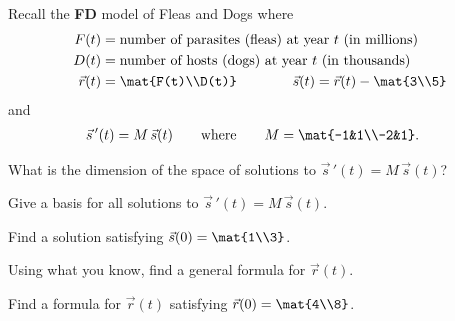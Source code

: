 \documentclass{workbook}
\begin{document}
\begin{slide}
	\question
 		Recall the \textbf{FD} model of Fleas and Dogs where 
	\begin{align*}
		F(t) &= \text{number of parasites (fleas) at year $t$ (in millions)}\\
		D(t) &= \text{number of hosts (dogs) at year $t$ (in thousands)}\\
		\vec r(t) &= \mat{F(t)\\D(t)} \qquad\qquad
		\vec s(t) = \vec r(t) - \mat{3\\5}
	\end{align*}
	and
	\begin{align*}
		\vec s\,'(t) &= M\,\vec s(t)\qquad\text{where}\qquad M=\mat{-1&1\\-2&1}.
	\end{align*}
	
	\begin{parts}
		\item What is the dimension of the space of solutions to $\vec s\,'(t) = M\,\vec s(t)$?
		\item Give a basis for all solutions to $\vec s\,'(t) = M\,\vec s(t)$.
		\item Find a solution satisfying $\vec s(0)=\mat{1\\3}$.
		\bigskip 
		\item Using what you know, find a general formula for $\vec r(t)$.
		\item Find a formula for $\vec r(t)$ satisfying $\vec r(0)=\mat{4\\8}$.
	\end{parts}
\end{slide}
\end{document}
